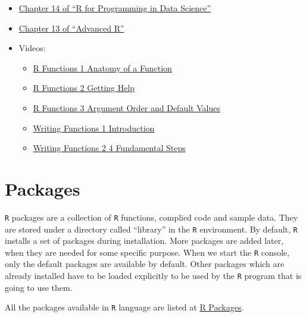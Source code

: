 \documentclass[
]{book}
\providecommand{\tightlist}{%
  \setlength{\itemsep}{0pt}\setlength{\parskip}{0pt}}
\begin{document}
\begin{itemize}
\tightlist
\item
  \href{https://bookdown.org/rdpeng/rprogdatascience/functions.html\#the-...-argument}{Chapter 14 of ``R for Programming in Data Science''}
\item
  \href{https://adv-r.hadley.nz/s3.html}{Chapter 13 of ``Advanced R''}
\item
  Videos:

  \begin{itemize}
  \tightlist
  \item
    \href{https://ucr.yuja.com/V/Video?v=2390137\&node=8588230\&a=1409376127\&autoplay=1}{R Functions 1 \textbar{} Anatomy of a Function}
  \item
    \href{https://ucr.yuja.com/V/Video?v=2368890\&node=8488096\&a=1477744713\&autoplay=1}{R Functions 2 \textbar{} Getting Help}
  \item
    \href{https://ucr.yuja.com/V/Video?v=2368889\&node=8488095\&a=762120086\&autoplay=1}{R Functions 3 \textbar{} Argument Order and Default Values}
  \item
    \href{https://ucr.yuja.com/V/Video?v=2700489\&node=9649685\&a=1404409900\&autoplay=1}{Writing Functions 1 \textbar{} Introduction}
  \item
    \href{https://ucr.yuja.com/V/Video?v=2700492\&node=9649688\&a=604881114\&autoplay=1}{Writing Functions 2 \textbar{} 4 Fundamental Steps}
  \end{itemize}
\end{itemize}

\hypertarget{packages}{%
\chapter{Packages}\label{packages}}

\texttt{R} packages are a collection of \texttt{R} functions, complied code and sample data. They are stored under a directory called ``library'' in the \texttt{R} environment. By default, \texttt{R} installs a set of packages during installation. More packages are added later, when they are needed for some specific purpose. When we start the \texttt{R} console, only the default packages are available by default. Other packages which are already installed have to be loaded explicitly to be used by the \texttt{R} program that is going to use them.

All the packages available in \texttt{R} language are listed at \href{https://cran.r-project.org/web/packages/available_packages_by_name.html}{R Packages}.
\end{document}
